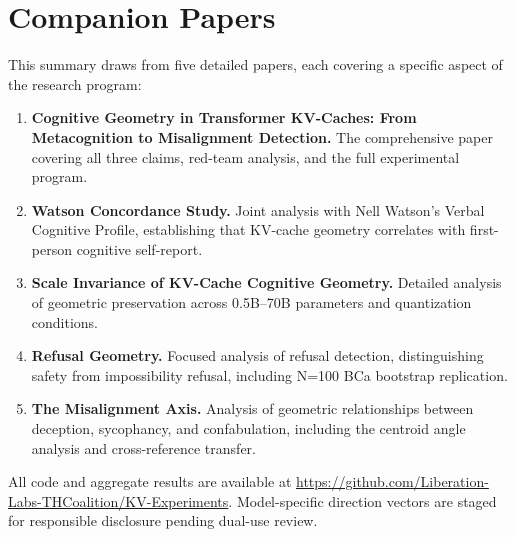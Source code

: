 \documentclass[11pt,letterpaper]{article}
\newcommand{\kvcache}{KV-cache\xspace}
\begin{document}
\section{Companion Papers}
\label{sec:companions}

This summary draws from five detailed papers, each covering a specific aspect of the research program:

\begin{enumerate}[itemsep=0.3em]
  \item \textbf{Cognitive Geometry in Transformer KV-Caches: From Metacognition to Misalignment Detection.}
  The comprehensive paper covering all three claims, red-team analysis, and the full experimental program.

  \item \textbf{Watson Concordance Study.}
  Joint analysis with Nell Watson's Verbal Cognitive Profile, establishing that \kvcache geometry correlates with first-person cognitive self-report.

  \item \textbf{Scale Invariance of KV-Cache Cognitive Geometry.}
  Detailed analysis of geometric preservation across 0.5B--70B parameters and quantization conditions.

  \item \textbf{Refusal Geometry.}
  Focused analysis of refusal detection, distinguishing safety from impossibility refusal, including N=100 BCa bootstrap replication.

  \item \textbf{The Misalignment Axis.}
  Analysis of geometric relationships between deception, sycophancy, and confabulation, including the centroid angle analysis and cross-reference transfer.
\end{enumerate}

All code and aggregate results are available at \url{https://github.com/Liberation-Labs-THCoalition/KV-Experiments}.
Model-specific direction vectors are staged for responsible disclosure pending dual-use review.



\end{document}
